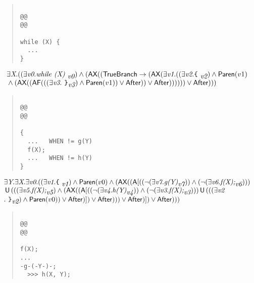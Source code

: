 \documentclass{article}
\newcommand{\U}{\,\mbox{\sf{U}}\,}
\newcommand{\A}{\mbox{\sf{A}}}
\newcommand{\AX}{\mbox{\sf{AX}}}
\newcommand{\AF}{\mbox{\sf{AF}}}
\newcommand{\mita}[1]{\mbox{\it{{#1}}}}
\newcommand{\msf}[1]{\mbox{\sf{{#1}}}}
\newcommand{\ttlb}{\mbox{\tt \char'173}}
\newcommand{\ttrb}{\mbox{\tt \char'175}}
\begin{document}
\begin{quote}\begin{verbatim}

@@
@@

while (X) {
  ...
}
\end{verbatim}\end{quote}

\[\begin{array}{l}
\exists \mita{X} . ((\exists \mita{v0} . \mita{while (X) }_{\mita{v0}}) \wedge (\AX((\msf{TrueBranch} \rightarrow (\AX(\exists \mita{v1} . ((\exists \mita{v2} . \mita{{\ttlb}
  }_{\mita{v2}}) \wedge \msf{Paren}(v1)\\\mbox{} \wedge (\AX((\AF(((\exists \mita{v3} . \mita{
{\ttrb}}_{\mita{v3}}) \wedge \msf{Paren}(v1)) \vee \msf{After})) \vee \msf{After})))))) \vee \msf{After})))
\end{array}\]

\begin{quote}\begin{verbatim}

@@
@@

{
  ...   WHEN != g(Y)
  f(X);
  ...   WHEN != h(Y)
}
\end{verbatim}\end{quote}

\[\begin{array}{l}
\exists \mita{Y} . \exists \mita{X} . \exists \mita{v0} . ((\exists \mita{v1} . \mita{{\ttlb}
  }_{\mita{v1}}) \wedge \msf{Paren}(v0) \wedge (\AX((\A[((\neg (\exists \mita{v7} . \mita{g(Y)}_{\mita{v7}})) \wedge (\neg (\exists \mita{v6} . \mita{f(X);}_{\mita{v6}})))\\\mbox{} \U (((\exists \mita{v5} . \mita{f(X);}_{\mita{v5}}) \wedge (\AX((\A[((\neg (\exists \mita{v4} . \mita{h(Y)}_{\mita{v4}})) \wedge (\neg (\exists \mita{v3} . \mita{f(X);}_{\mita{v3}}))) \U (((\exists \mita{v2}\\\mbox{} . \mita{
{\ttrb}}_{\mita{v2}}) \wedge \msf{Paren}(v0)) \vee \msf{After})]
) \vee \msf{After}))) \vee \msf{After})]
) \vee \msf{After})))
\end{array}\]

\begin{quote}\begin{verbatim}

@@
@@

f(X);
...
-g-(-Y-)-;
  >>> h(X, Y);

\end{verbatim}\end{quote}
\end{document}
